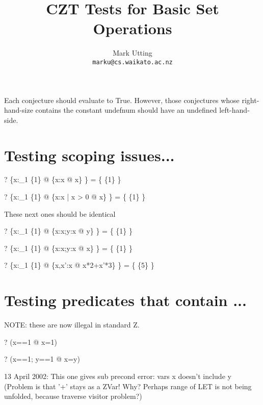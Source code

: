 \documentclass{article}
\title{CZT Tests for Basic Set Operations}
\author{Mark Utting \\ \texttt{marku@cs.waikato.ac.nz}}
\begin{document}
\maketitle

Each conjecture should evaluate to True.
However, those conjectures whose right-hand-size contains
the constant undefnum should have an undefined left-hand-side.


\section{Testing scoping issues...}

\begin{zed} \vdash? \{x:\power_1 \{1\} @ \{x:x @ x\} \} = \{ \{1\} \} \end{zed}
\begin{zed} \vdash? \{x:\power_1 \{1\} @ \{x:x | x > 0 @ x\} \} = \{ \{1\} \} \end{zed}

 These next ones should be identical
\begin{zed} \vdash? \{x:\power_1 \{1\} @ \{x:x;y:x @ y\} \} = \{ \{1\} \} \end{zed}
\begin{zed} \vdash? \{x:\power_1 \{1\} @ \{x:x;y:x @ x\} \} = \{ \{1\} \} \end{zed}

\begin{zed} \vdash? \{x:\power_1 \{1\} @ \{x,x':x @ x*2+x'*3\} \} = \{ \{5\} \} \end{zed}


\section{Testing predicates that contain \LET...}
NOTE: these are now illegal in standard Z.
\begin{zed} \vdash? (\LET x==1 @ x=1) \end{zed}
\begin{zed} \vdash? (\LET x==1; y==1 @ x=y) \end{zed}

 13 April 2002: This one gives sub precond error: vars {x} doesn't include y
 (Problem is that '+' stays as a ZVar!  Why?  Perhaps range of LET
  is not being unfolded, because traverse visitor problem?)
\end{document}

